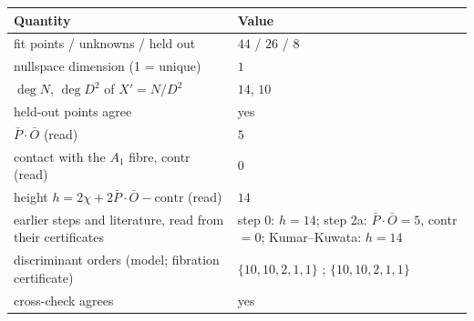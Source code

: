 \begin{tabular}{p{5.6cm}p{8.6cm}}
\toprule
Quantity & Value \\
\midrule
fit points / unknowns / held out & $44$ / $26$ / $8$ \\
nullspace dimension (1 = unique) & $1$ \\
$\deg N$, $\deg D^2$ of $X'=N/D^2$ & $14$, $10$ \\
held-out points agree & yes \\
$\bar P\cdot\bar O$ (read) & $5$ \\
contact with the $A_1$ fibre, contr (read) & $0$ \\
height $h=2\chi+2\bar P\cdot\bar O-\mathrm{contr}$ (read) & $14$ \\
earlier steps and literature, read from their certificates & step 0: $h=14$; step 2a: $\bar P\cdot\bar O=5$, contr $=0$; Kumar--Kuwata: $h=14$ \\
discriminant orders (model; fibration certificate) & $\{10,10,2,1,1\}$ ; $\{10,10,2,1,1\}$ \\
cross-check agrees & yes \\
\bottomrule
\end{tabular}
